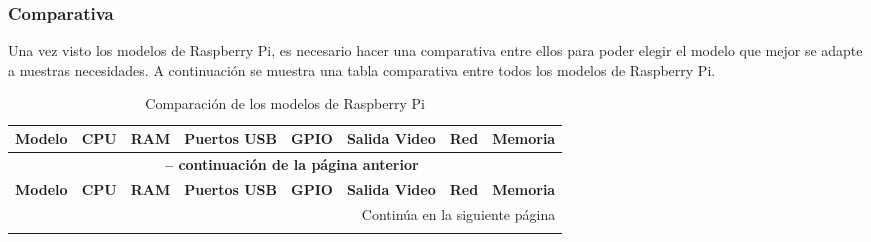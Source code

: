 \subsubsection{Comparativa}
    Una vez visto los modelos de Raspberry Pi, es necesario hacer una comparativa entre ellos para poder
        elegir el modelo que mejor se adapte a nuestras necesidades. A continuaci\'on se muestra una tabla
        comparativa entre todos los modelos de Raspberry Pi.
    
    {\small %
        \begin{longtable}{|p{1.8cm}|p{2.8cm}|p{1.2cm}|p{1.5cm}|p{1.5cm}|p{2.0cm}|p{2.0cm}|p{2.0cm}|}
        \caption{Comparaci\'on de los modelos de Raspberry Pi} \\
        \hline
        \textbf{Modelo} & \textbf{CPU} & \textbf{RAM} & \textbf{Puertos USB} & \textbf{GPIO} & \textbf{Salida Video} & \textbf{Red} & \textbf{Memoria} \\ \hline
        \endfirsthead

        \multicolumn{8}{c}{{\bfseries \tablename\ \thetable{} -- continuaci\'on de la p\'agina anterior}} \\
        \hline
        \textbf{Modelo} & \textbf{CPU} & \textbf{RAM} & \textbf{Puertos USB} & \textbf{GPIO} & \textbf{Salida Video} & \textbf{Red} & \textbf{Memoria} \\ \hline
        \endhead

        \hline \multicolumn{8}{|r|}{{Contin\'ua en la siguiente p\'agina}} \\ \hline
        \endfoot


\end{longtable}}
